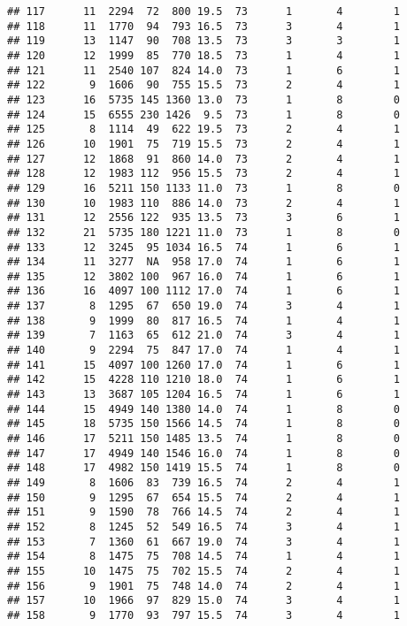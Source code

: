 \documentclass{article}\usepackage[]{graphicx}\usepackage[]{color}
\makeatletter
\newenvironment{kframe}{%
 \def\at@end@of@kframe{}%
 \ifinner\ifhmode%
  \def\at@end@of@kframe{\end{minipage}}%
  \begin{minipage}{\columnwidth}%
 \fi\fi%
 \def\FrameCommand##1{\hskip\@totalleftmargin \hskip-\fboxsep
 \colorbox{shadecolor}{##1}\hskip-\fboxsep
     \hskip-\linewidth \hskip-\@totalleftmargin \hskip\columnwidth}%
 \MakeFramed {\advance\hsize-\width
   \@totalleftmargin\z@ \linewidth\hsize
   \@setminipage}}%
 {\par\unskip\endMakeFramed%
 \at@end@of@kframe}
\newenvironment{knitrout}{}{} %
\makeatother
\begin{document}
\begin{knitrout}
\begin{kframe}
\begin{verbatim}
## 117      11  2294  72  800 19.5  73      1       4        1
## 118      11  1770  94  793 16.5  73      3       4        1
## 119      13  1147  90  708 13.5  73      3       3        1
## 120      12  1999  85  770 18.5  73      1       4        1
## 121      11  2540 107  824 14.0  73      1       6        1
## 122       9  1606  90  755 15.5  73      2       4        1
## 123      16  5735 145 1360 13.0  73      1       8        0
## 124      15  6555 230 1426  9.5  73      1       8        0
## 125       8  1114  49  622 19.5  73      2       4        1
## 126      10  1901  75  719 15.5  73      2       4        1
## 127      12  1868  91  860 14.0  73      2       4        1
## 128      12  1983 112  956 15.5  73      2       4        1
## 129      16  5211 150 1133 11.0  73      1       8        0
## 130      10  1983 110  886 14.0  73      2       4        1
## 131      12  2556 122  935 13.5  73      3       6        1
## 132      21  5735 180 1221 11.0  73      1       8        0
## 133      12  3245  95 1034 16.5  74      1       6        1
## 134      11  3277  NA  958 17.0  74      1       6        1
## 135      12  3802 100  967 16.0  74      1       6        1
## 136      16  4097 100 1112 17.0  74      1       6        1
## 137       8  1295  67  650 19.0  74      3       4        1
## 138       9  1999  80  817 16.5  74      1       4        1
## 139       7  1163  65  612 21.0  74      3       4        1
## 140       9  2294  75  847 17.0  74      1       4        1
## 141      15  4097 100 1260 17.0  74      1       6        1
## 142      15  4228 110 1210 18.0  74      1       6        1
## 143      13  3687 105 1204 16.5  74      1       6        1
## 144      15  4949 140 1380 14.0  74      1       8        0
## 145      18  5735 150 1566 14.5  74      1       8        0
## 146      17  5211 150 1485 13.5  74      1       8        0
## 147      17  4949 140 1546 16.0  74      1       8        0
## 148      17  4982 150 1419 15.5  74      1       8        0
## 149       8  1606  83  739 16.5  74      2       4        1
## 150       9  1295  67  654 15.5  74      2       4        1
## 151       9  1590  78  766 14.5  74      2       4        1
## 152       8  1245  52  549 16.5  74      3       4        1
## 153       7  1360  61  667 19.0  74      3       4        1
## 154       8  1475  75  708 14.5  74      1       4        1
## 155      10  1475  75  702 15.5  74      2       4        1
## 156       9  1901  75  748 14.0  74      2       4        1
## 157      10  1966  97  829 15.0  74      3       4        1
## 158       9  1770  93  797 15.5  74      3       4        1

\end{verbatim}
\end{kframe}
\end{knitrout}
\end{document}
